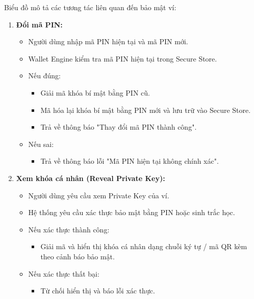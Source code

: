 \documentclass[a4paper]{report}
\begin{document}
Biểu đồ mô tả các tương tác liên quan đến bảo mật ví:

\begin{enumerate}
    \item \textbf{Đổi mã PIN:}
    \begin{itemize}
        \item Người dùng nhập mã PIN hiện tại và mã PIN mới.
        \item Wallet Engine kiểm tra mã PIN hiện tại trong Secure Store.
        \item Nếu đúng:
            \begin{itemize}
                \item Giải mã khóa bí mật bằng PIN cũ.
                \item Mã hóa lại khóa bí mật bằng PIN mới và lưu trữ vào Secure Store.
                \item Trả về thông báo "Thay đổi mã PIN thành công".
            \end{itemize}
        \item Nếu sai:
            \begin{itemize}
                \item Trả về thông báo lỗi "Mã PIN hiện tại không chính xác".
            \end{itemize}
    \end{itemize}

    \item \textbf{Xem khóa cá nhân (Reveal Private Key):}
    \begin{itemize}
        \item Người dùng yêu cầu xem Private Key của ví.
        \item Hệ thống yêu cầu xác thực bảo mật bằng PIN hoặc sinh trắc học.
        \item Nếu xác thực thành công:
            \begin{itemize}
                \item Giải mã và hiển thị khóa cá nhân dạng chuỗi ký tự / mã QR kèm theo cảnh báo bảo mật.
            \end{itemize}
        \item Nếu xác thực thất bại:
            \begin{itemize}
                \item Từ chối hiển thị và báo lỗi xác thực.
            \end{itemize}
    \end{itemize}
\end{enumerate}
\end{document}
